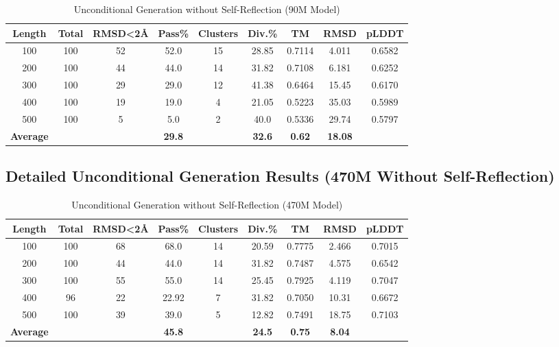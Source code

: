 \documentclass[11pt,a4paper]{article}
\begin{document}
\begin{table}[h]
\centering
\caption{Unconditional Generation without Self-Reflection (90M Model)}
\begin{tabular}{@{}ccccccccc@{}}
\toprule
\textbf{Length} & \textbf{Total} & \textbf{RMSD<2Å} & \textbf{Pass\%} & \textbf{Clusters} & \textbf{Div.\%} & \textbf{TM} & \textbf{RMSD} & \textbf{pLDDT} \\
\midrule
100 & 100 & 52 & 52.0 & 15 & 28.85 & 0.7114 & 4.011 & 0.6582 \\
200 & 100 & 44 & 44.0 & 14 & 31.82 & 0.7108 & 6.181 & 0.6252 \\
300 & 100 & 29 & 29.0 & 12 & 41.38 & 0.6464 & 15.45 & 0.6170 \\
400 & 100 & 19 & 19.0 & 4 & 21.05 & 0.5223 & 35.03 & 0.5989 \\
500 & 100 & 5 & 5.0 & 2 & 40.0 & 0.5336 & 29.74 & 0.5797 \\
\midrule
\textbf{Average} & & & \textbf{29.8} & & \textbf{32.6} & \textbf{0.62} & \textbf{18.08} & \\
\bottomrule
\end{tabular}
\label{tab:uncond_without_reflection}
\end{table}

\subsection{Detailed Unconditional Generation Results (470M Without Self-Reflection)}

\begin{table}[h]
\centering
\caption{Unconditional Generation without Self-Reflection (470M Model)}
\begin{tabular}{@{}ccccccccc@{}}
\toprule
\textbf{Length} & \textbf{Total} & \textbf{RMSD<2Å} & \textbf{Pass\%} & \textbf{Clusters} & \textbf{Div.\%} & \textbf{TM} & \textbf{RMSD} & \textbf{pLDDT} \\
\midrule
100 & 100 & 68 & 68.0 & 14 & 20.59 & 0.7775 & 2.466 & 0.7015 \\
200 & 100 & 44 & 44.0 & 14 & 31.82 & 0.7487 & 4.575 & 0.6542 \\
300 & 100 & 55 & 55.0 & 14 & 25.45 & 0.7925 & 4.119 & 0.7047 \\
400 & 96 & 22 & 22.92 & 7 & 31.82 & 0.7050 & 10.31 & 0.6672 \\
500 & 100 & 39 & 39.0 & 5 & 12.82 & 0.7491 & 18.75 & 0.7103 \\
\midrule
\textbf{Average} & & & \textbf{45.8} & & \textbf{24.5} & \textbf{0.75} & \textbf{8.04} & \\
\bottomrule
\end{tabular}
\label{tab:uncond_470m_no_reflection}
\end{table}
\end{document}
